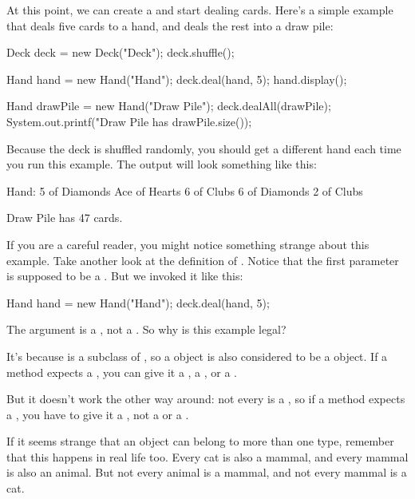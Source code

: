 At this point, we can create a  and start dealing cards.
Here's a simple example that deals five cards to a hand, and deals the rest into a draw pile:

\begin{code}
Deck deck = new Deck("Deck");
deck.shuffle();

Hand hand = new Hand("Hand");
deck.deal(hand, 5);
hand.display();

Hand drawPile = new Hand("Draw Pile");
deck.dealAll(drawPile);
System.out.printf("Draw Pile has %
                  drawPile.size());
\end{code}

Because the deck is shuffled randomly, you should get a different hand each time you run this example.
The output will look something like this:

\begin{stdout}
Hand:
5 of Diamonds
Ace of Hearts
6 of Clubs
6 of Diamonds
2 of Clubs

Draw Pile has 47 cards.
\end{stdout}

If you are a careful reader, you might notice something strange about this example.
Take another look at the definition of .
Notice that the first parameter is supposed to be a .
But we invoked it like this:

\begin{code}
Hand hand = new Hand("Hand");
deck.deal(hand, 5);
\end{code}

The argument is a , not a .
So why is this example legal?

It's because  is a subclass of , so a  object is also considered to be a  object.
If a method expects a , you can give it a , a , or a .

But it doesn't work the other way around: not every  is a , so if a method expects a , you have to give it a , not a  or a .

If it seems strange that an object can belong to more than one type, remember that this happens in real life too.
Every cat is also a mammal, and every mammal is also an animal.
But not every animal is a mammal, and not every mammal is a cat.

